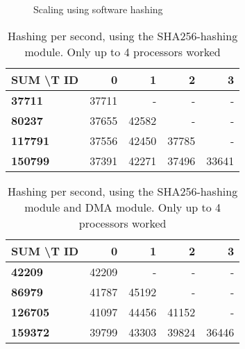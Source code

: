 \begin{figure}
	\caption{Scaling using software hashing}
	\label{fig:sw-scaling}
\end{figure}


\begin{table}
\begin{tabular}{ | l || r | r | r | r |}
  \hline 
  \textbf{SUM \textbackslash T ID} & \textbf{0} & \textbf{1} & \textbf{2} & \textbf{3}\\
  \hline                       
  \textbf{37711} & 37711 & - & - & - \\
  \textbf{80237} & 37655 & 42582 & - & - \\
  \textbf{117791} & 37556 & 42450 & 37785 & - \\
  \textbf{150799} & 37391 & 42271 & 37496 & 33641 \\
  \hline  
\end{tabular}
\caption{Hashing per second, using the SHA256-hashing module. Only up to 4 processors worked}
\label{tab:Perf-SHA}
\end{table}

\begin{table}
\begin{tabular}{| l || r | r | r | r |}
  \hline 
  \textbf{SUM \textbackslash T ID} & \textbf{0} & \textbf{1} & \textbf{2} & \textbf{3}\\
  \hline                       
  \textbf{42209} & 42209 & - & - & - \\
  \textbf{86979} & 41787 & 45192 & - & - \\
  \textbf{126705} & 41097 & 44456 & 41152 & - \\
  \textbf{159372} & 39799 & 43303 & 39824 & 36446 \\
  \hline  
\end{tabular}
\caption{Hashing per second, using the SHA256-hashing module and DMA module. Only up to 4 processors worked}
\label{tab:Perf-SHADMA}
\end{table}

